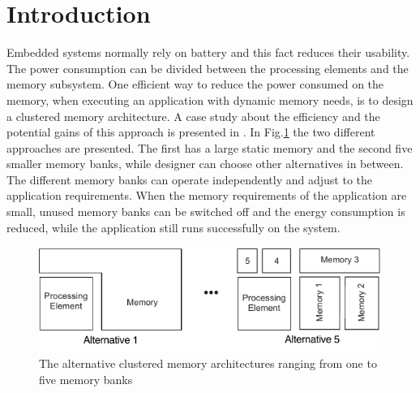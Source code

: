 \section{Introduction}

Embedded systems normally rely on battery and this fact reduces their usability.
The power consumption can be divided between the processing elements and the memory subsystem.
One efficient way to reduce the power consumed on the memory, when executing an application with dynamic memory needs, is to design a clustered memory architecture.
A case study about the efficiency and the potential gains of this approach is presented in \cite{filippopoulos2013exploration}.
In Fig.\ref{fig:platformE} the two different approaches are presented.
The first has a large static memory and the second five smaller memory banks, while designer can choose other alternatives in between.
The different memory banks can operate independently and  adjust to the application requirements.
When the memory requirements of the application are small, unused memory banks can be switched off and the energy consumption is reduced, while the application still runs successfully on the system. 

\begin{figure}
 \centering
 \includegraphics[width = \textwidth]{E/platform.pdf}
  \caption{The alternative clustered memory architectures ranging from one to five memory banks}
 \label{fig:platformE}
 \end{figure}
 
